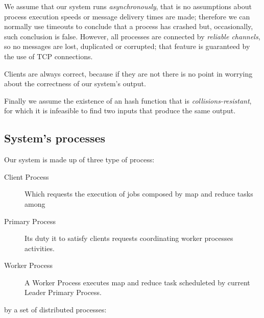 \documentclass[sigchi]{acmart}
\begin{document}
We assume that our system runs \textit{asynchronously}, that is no assumptions about process execution speeds or message delivery times are made; therefore we can normally use timeouts to conclude that a process has crashed but, occasionally, such conclusion is false. However, all processes are connected by \textit{reliable channels}, so no messages are lost, duplicated or corrupted; that feature is guaranteed by the use of TCP connections. 

Clients are always correct, because if they are not there is no point in worrying about the correctness of our system's output.

Finally we assume the existence of an hash function that is \textit{collisions-resistant}, for which it is infeasible to find two inputs that produce the same output.

\subsection{System's processes}

Our system is made up of three type of process:

\begin{description}
\item[Client Process] Which requests the execution of jobs composed by map and reduce tasks among

\item[Primary Process] Its duty it to satisfy clients requests coordinating worker processes activities. 

\item[Worker Process] A Worker Process executes map and reduce task scheduleted by current Leader Primary Process.
\end{description}



 by a set of distributed processes:
\end{document}
